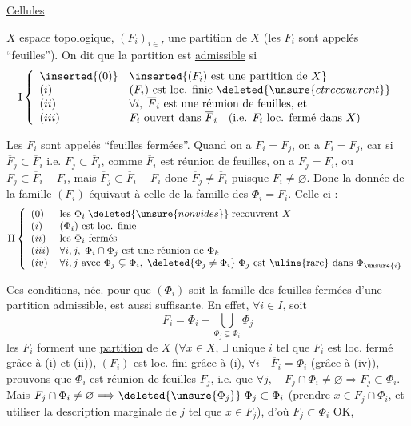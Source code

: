\uline{Cellules}

$X$ espace topologique, $(F_i)_{i\in I}$ une partition de $X$ (les $F_i$ sont appelés ``feuilles''). On dit que la partition est \uline{admissible} si
\[
\mathrm I\left\{\begin{array}{ll}
\inserted{(0)}&\inserted{(F_i)\text{ est une partition de }X}\\
(i)&(F_i)\text{ est loc. finie }\deleted{\unsure{et recouvrent}}\\
(ii)&\forall i,\;\overline F_i\text{ est une réunion de feuilles, et}\\
(iii)&F_i\text{ ouvert dans }\overline F_i\quad(\text{i.e. }F_i\text{ loc. fermé dans }X)
\end{array}\right.
\]

Les $\overline F_i$ sont appelés ``feuilles fermées''. Quand on a $\overline F_i=\overline F_j$, on a $F_i=F_j$, car si $\overline F_j\subset\overline F_i$ i.e. $F_j\subset\overline F_i$, comme $\overline F_i$ est réunion de feuilles, on a $F_j=F_i$, ou $F_j\subset\overline F_i-F_i$, mais   $\overline F_j\subset\overline F_i-F_i$ donc $\overline F_j\neq\overline F_i$ puisque $F_i\neq\varnothing$. Donc la donnée de la famille $(F_i)$ équivaut à celle de la famille des $\Phi_i=F_i$. Celle-ci  :
\[
\mathrm{II}\left\{\begin{array}{ll}
(0)&\text{les }\Phi_i\;\deleted{\unsure{non vides}}\;\text{recouvrent }X\\
(i)&(\Phi_i)\text{ est loc. finie}\\
(ii)&\text{les }\Phi_i\text{ fermés}\\
(iii)&\forall i,j,\;\Phi_i\cap\Phi_j\text{ est une réunion de }\Phi_k\\
(iv)&\forall i,j\text{ avec }\Phi_j\subsetneq\Phi_i,\;
\deleted{\Phi_j\neq\Phi_i}\;\Phi_j\text{ est \uline{rare} dans }\Phi_{\unsure{i}}
\end{array}\right.
\]

Ces conditions, néc. pour que $(\Phi_i)$ soit la famille des feuilles fermées d'une partition admissible, est aussi suffisante. En effet, $\forall i\in I$, soit 
\[
F_i=\Phi_i-\bigcup_{\Phi_j\subsetneq\Phi_i}\Phi_j
\]
les $F_i$ forment une \uline{partition} de $X$ ($\forall x\in X$, $\exists$ unique $i$ tel que
$F_i$ est loc. fermé grâce à (i) et (ii)), $(F_i)$ est loc. fini grâce à (i),  $\forall i\quad\overline F_i=\Phi_i$ (grâce à (iv)),
prouvons que $\Phi_i$ est réunion de feuilles $F_j$, i.e.
que $\forall j,\quad F_j\cap\Phi_i\neq\varnothing\Rightarrow F_j\subset\Phi_i$.
Mais $F_j\cap\Phi_i\neq\varnothing\Longrightarrow\deleted{\unsure{\Phi_j}}\;\Phi_j\subset\Phi_i$ (prendre $x\in F_j\cap\Phi_i$, et utiliser la description marginale de $j$ tel que $x\in F_j$), d'où $F_j\subset\Phi_i$ OK,

